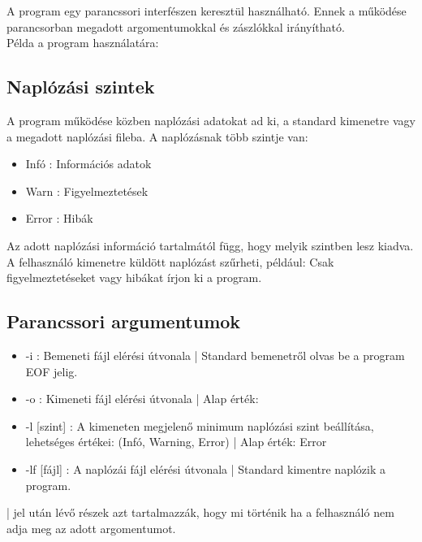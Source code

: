 \documentclass[../spec.tex]{subfiles}
\begin{document}
    A program egy parancssori interfészen keresztül használható.
    Ennek a működése parancsorban megadott argomentumokkal és zászlókkal irányítható.\\
    Példa a program használatára: \\

    \subsection{Naplózási szintek}\label{subsec:napló-szintek}
    A program működése közben naplózási adatokat ad ki, a standard kimenetre vagy a megadott naplózási fileba.
    A naplózásnak több szintje van:
    \begin{itemize}
        \item Infó : Információs adatok
        \item Warn : Figyelmeztetések
        \item Error : Hibák
    \end{itemize}
    Az adott naplózási információ tartalmától függ, hogy melyik szintben lesz kiadva.
    A felhasználó kimenetre küldött naplózást szűrheti, például: Csak figyelmeztetéseket vagy hibákat írjon ki a program.

    \subsection{Parancssori argumentumok}\label{subsec:args}
    \begin{itemize}
        \item -i : Bemeneti fájl elérési útvonala | Standard bemenetről olvas be a program EOF jelig.
        \item -o : Kimeneti fájl elérési útvonala | Alap érték: 
        \item -l [szint] : A kimeneten megjelenő minimum naplózási szint beállítása,  lehetséges értékei:  (Infó, Warning, Error) | Alap érték: Error
        \item -lf [fájl] : A naplózái fájl elérési útvonala | Standard kimentre naplózik a program.
    \end{itemize}
    | jel után lévő részek azt tartalmazzák, hogy mi történik ha a felhasználó nem adja meg az adott argomentumot.
\end{document}
